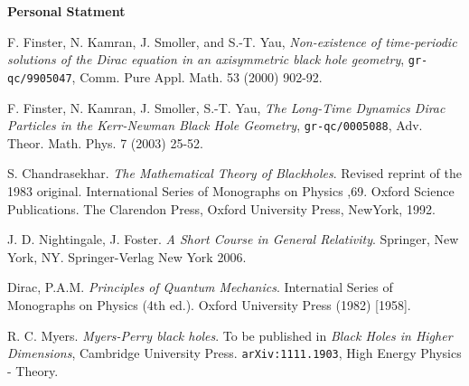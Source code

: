 \documentclass[12pt]{article}
\begin{document}
\textbf{Personal Statment}



\newpage
\begin{thebibliography}{9}
  F. Finster, N. Kamran, J. Smoller, and S.-T. Yau, \textit{Non-existence of time-periodic solutions of the Dirac equation in an axisymmetric black hole geometry}, \texttt{gr-qc/9905047}, Comm. Pure Appl. Math. 53 (2000) 902-92.

  F. Finster, N. Kamran, J. Smoller, S.-T. Yau, \textit{The Long-Time Dynamics Dirac Particles in the Kerr-Newman Black Hole Geometry}, \texttt{gr-qc/0005088}, Adv. Theor. Math. Phys. 7 (2003) 25-52.

  S. Chandrasekhar. \textit{The Mathematical Theory of Blackholes}. Revised reprint of the 1983 original. International Series of Monographs on Physics ,69. Oxford Science Publications. The Clarendon Press, Oxford University Press, NewYork, 1992.	

  J. D. Nightingale, J. Foster. \textit{A Short Course in General Relativity}. Springer, New York, NY. Springer-Verlag New York 2006.

  Dirac, P.A.M. \textit{Principles of Quantum Mechanics}. Internatial Series of Monographs on Physics (4th ed.). Oxford University Press (1982) [1958].

  R. C. Myers. \textit{Myers-Perry black holes}. To be published in \textit{Black Holes in Higher Dimensions}, Cambridge University Press. \texttt{arXiv:1111.1903}, High Energy Physics - Theory.
  
\end{thebibliography}
\end{document}
